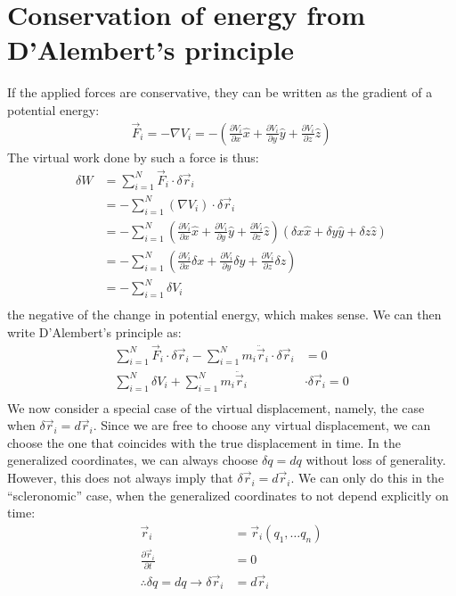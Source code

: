 \section{Conservation of energy from D'Alembert's principle}
If the applied forces are conservative, they can be written as the gradient of a potential energy:
\begin{align}
\vec{F}_i=-\nabla V_i = -\left(\frac{\partial V_i}{\partial x}\hat{x}+\frac{\partial V_i}{\partial y}\hat{y}+\frac{\partial V_i}{\partial z}\hat{z}\right)
\end{align}
The virtual work done by such a force is thus:
\begin{align}
\delta W &= \sum_{i=1}^N \vec{F}_i\cdot\delta\vec{r}_i\nonumber\\
&=-\sum_{i=1}^N(\nabla V_i)\cdot\delta\vec{r}_i\nonumber\\
&=-\sum_{i=1}^N \left(\frac{\partial V_i}{\partial x}\hat{x}+\frac{\partial V_i}{\partial y}\hat{y}+\frac{\partial V_i}{\partial z}\hat{z}\right)(\delta x\hat{x}+\delta y\hat{y}+\delta  
z\hat{z})\nonumber\\
&=-\sum_{i=1}^N\left(\frac{\partial V_i}{\partial x}\delta x+\frac{\partial V_i}{\partial y}\delta y+\frac{\partial V_i}{\partial z}\delta z\right)\nonumber\\
&=-\sum_{i=1}^N \delta V_i\nonumber\\
\end{align}
the negative of the change in potential energy, which makes sense. We can then write D'Alembert's principle as:
\begin{align}
\sum_{i=1}^N \vec{F}_i\cdot\delta\vec{r}_i-\sum_{i=1}^N m_i\ddot{\vec{r}}_i\cdot\delta\vec{r}_i&=0\nonumber\\
\sum_{i=1}^N\delta V_i +\sum_{i=1}^N m_i\ddot{\vec{r}}_i&\cdot\delta\vec{r}_i=0\nonumber\\
\end{align}
We now consider a special case of the virtual displacement, namely, the case when $\delta\vec{r}_i=d\vec{r}_i$. Since we are free to choose any virtual displacement, we can choose the one that coincides with the true displacement in time. In the generalized coordinates,  we can always choose $\delta q = dq$ without loss of generality. However, this does not always imply that $\delta \vec{r}_i=d\vec{r}_i$. We can only do this in the ``scleronomic'' case, when the generalized coordinates to not depend explicitly on time:
\begin{align}
\vec{r}_i&=\vec{r}_i(q_1,\dots q_n)\nonumber\\
\frac{\partial \vec{r}_i}{\partial t}&= 0\nonumber\\
\therefore \delta q=dq\to \delta \vec{r}_i&=d\vec{r}_i\nonumber\\
\end{align}

